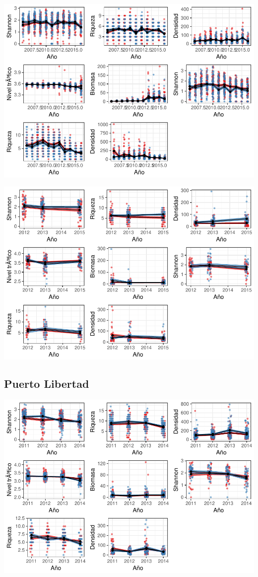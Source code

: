 \documentclass[12pt,]{article}
\begin{document}
\includegraphics{Manuscript_files/figure-latex/unnamed-chunk-7-1.pdf}

\includegraphics{Manuscript_files/figure-latex/unnamed-chunk-8-1.pdf}

\subsection{Puerto Libertad}\label{puerto-libertad-1}

\includegraphics{Manuscript_files/figure-latex/unnamed-chunk-9-1.pdf}
\end{document}
